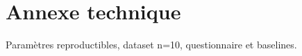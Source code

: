 \documentclass[11pt,a4paper]{article}
\begin{document}
\section*{Annexe technique}
Paramètres reproductibles, dataset n=10, questionnaire et baselines.
\end{document}
